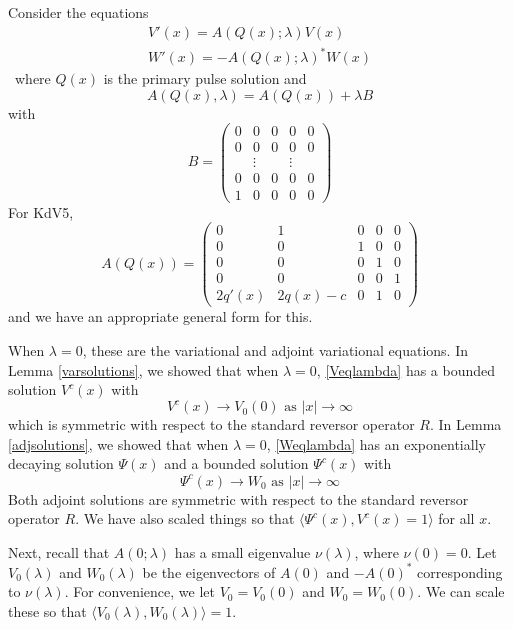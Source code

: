 \documentclass[thesis.tex]{subfiles}
\begin{document}
Consider the equations
\begin{align}
V'(x) = A(Q(x); \lambda) V(x) \label{Veqlambda} \\
W'(x) = -A(Q(x); \lambda)^* W(x) \label{Weqlambda}
\end{align}\
where $Q(x)$ is the primary pulse solution and 
\[
A(Q(x), \lambda) = A(Q(x)) + \lambda B
\]
with 
\begin{equation*}
B = \begin{pmatrix}0 & 0 & 0 & 0 & 0 \\0 & 0 & 0 & 0 & 0 \\  & 
\vdots & & \vdots & \\0 & 0 & 0 & 0 & 0 \\1 & 0 & 0 & 0 & 0 \end{pmatrix} 
\end{equation*}
For KdV5, 
\begin{equation*}
A(Q(x)) = \begin{pmatrix}0 & 1 & 0 & 0 & 0 \\ 0 & 0 & 1 & 0 & 0 \\ 0 & 0 & 0 & 1 & 0 \\ 0 & 0 & 0 & 0 & 1 \\
2q'(x) & 2 q(x) - c & 0 & 1 & 0 
\end{pmatrix}
\end{equation*}
and we have an appropriate general form for this.

When $\lambda = 0$, these are the variational and adjoint variational equations. In Lemma \ref{varsolutions}, we showed that when $\lambda = 0$, \eqref{Veqlambda} has a bounded solution $V^c(x)$ with
\[
V^c(x) \rightarrow V_0(0) \text{ as }|x| \rightarrow \infty
\]
which is symmetric with respect to the standard reversor operator $R$. In Lemma \ref{adjsolutions}, we showed that when $\lambda = 0$, \eqref{Weqlambda} has an exponentially decaying solution $\Psi(x)$ and a bounded solution $\Psi^c(x)$ with 
\[
\Psi^c(x) \rightarrow W_0 \text{ as }|x| \rightarrow \infty
\]
Both adjoint solutions are symmetric with respect to the standard reversor operator $R$. We have also scaled things so that $\langle \Psi^c(x), V^c(x) = 1 \rangle$ for all $x$.

Next, recall that $A(0; \lambda)$ has a small eigenvalue $\nu(\lambda)$, where $\nu(0) = 0$. Let $V_0(\lambda)$ and $W_0(\lambda)$ be the eigenvectors of $A(0)$ and $-A(0)^*$ corresponding to $\nu(\lambda)$. For convenience, we let $V_0 = V_0(0)$ and $W_0 = W_0(0)$. We can scale these so that $\langle V_0(\lambda), W_0(\lambda) \rangle = 1$.
\end{document}
